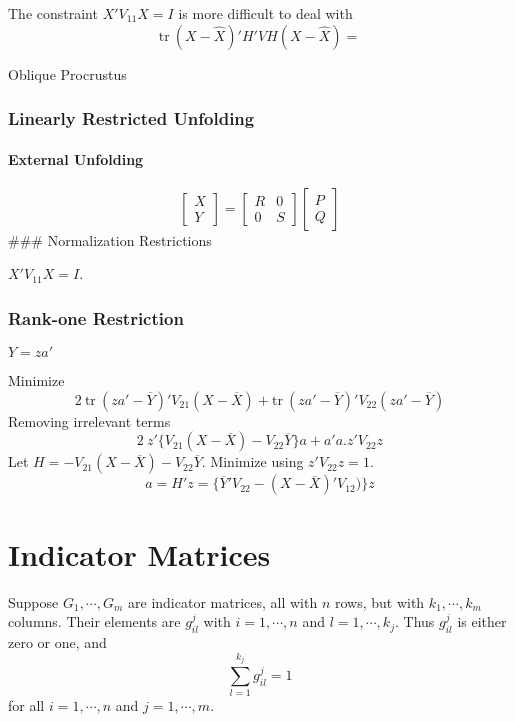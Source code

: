 \documentclass[
  12pt,
]{article}
\begin{document}
The constraint \(X'V_{11}X=I\) is more difficult to deal with
\[
\text{tr}\ (X-\hat X)'H'VH(X-\hat X)=
\]

Oblique Procrustus

\subsubsection{Linearly Restricted Unfolding}\label{linearly-restricted-unfolding}

\paragraph{External Unfolding}\label{external-unfolding}

\[
\begin{bmatrix}
X\\Y
\end{bmatrix}=
\begin{bmatrix}
R&0\\
0&S
\end{bmatrix}
\begin{bmatrix}
P\\
Q
\end{bmatrix}
\]
\#\#\# Normalization Restrictions

\(X'V_{11}X=I\).

\subsubsection{Rank-one Restriction}\label{rank-one-restriction}

\(Y=za'\)

Minimize
\[
2\ \text{tr}\ (za'-\overline{Y})'V_{21}(X-\overline{X})+
\text{tr}\ (za'-\overline{Y})'V_{22}(za'-\overline{Y})
\]
Removing irrelevant terms
\[
2\ z'\{V_{21}(X-\overline{X})-V_{22}\overline{Y}\}a+
a'a.z'V_{22}z
\]
Let \(H=-V_{21}(X-\overline{X})-V_{22}\overline{Y}\). Minimize using \(z'V_{22}z=1\).
\[
a=H'z=\{\overline{Y}'V_{22}-(X-\overline{X})'V_{12})\}z
\]

\section{Indicator Matrices}\label{indicator-matrices}

Suppose \(G_1,\cdots,G_m\) are indicator matrices, all with \(n\) rows, but with
\(k_1,\cdots,k_m\) columns. Their elements are \(g_{il}^j\) with \(i=1,\cdots,n\)
and \(l=1,\cdots,k_j\). Thus \(g_{il}^j\) is either zero or one, and
\[
\sum_{l=1}^{k_j}g_{il}^j=1
\]
for all \(i=1,\cdots,n\) and \(j=1,\cdots,m\).
\end{document}
